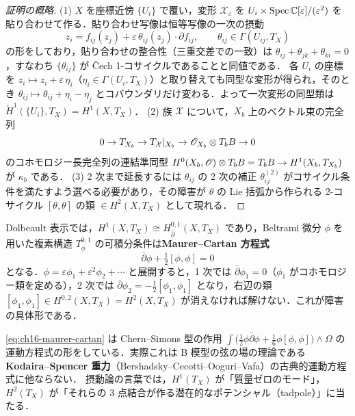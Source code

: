 \begin{proof}[証明の概略]
(1) $X$ を座標近傍 $\{U_i\}$ で覆い，変形 $\mathcal{X}_\varepsilon$ を $U_i\times\operatorname{Spec}\mathbb{C}[\varepsilon]/(\varepsilon^2)$ を貼り合わせて作る．貼り合わせ写像は恒等写像の一次の摂動
\[
z_i=f_{ij}(z_j)+\varepsilon\,\theta_{ij}(z_j)\cdot\partial f_{ij},\qquad \theta_{ij}\in\Gamma(U_{ij},T_X)
\]
の形をしており，貼り合わせの整合性（三重交差での一致）は $\theta_{ij}+\theta_{jk}+\theta_{ki}=0$，すなわち $\{\theta_{ij}\}$ が \v{C}ech 1-コサイクルであることと同値である．
各 $U_i$ の座標を $z_i\mapsto z_i+\varepsilon\,\eta_i$（$\eta_i\in\Gamma(U_i,T_X)$）と取り替えても同型な変形が得られ，そのとき $\theta_{ij}\mapsto\theta_{ij}+\eta_i-\eta_j$ とコバウンダリだけ変わる．よって一次変形の同型類は $\check H^1(\{U_i\},T_X)=H^1(X,T_X)$．
(2) 族 $\mathcal{X}$ について，$X_b$ 上のベクトル束の完全列
\[
0\to T_{X_b}\to T_{\mathcal{X}}|_{X_b}\to \mathscr{O}_{X_b}\otimes T_bB\to0
\]
のコホモロジー長完全列の連結準同型 $H^0(X_b,\mathscr{O})\otimes T_bB=T_bB\to H^1(X_b,T_{X_b})$ が $\kappa_b$ である．
(3) 2 次まで延長するには $\theta_{ij}$ の 2 次の補正 $\theta^{(2)}_{ij}$ がコサイクル条件を満たすよう選べる必要があり，その障害が $\theta$ の Lie 括弧から作られる 2-コサイクル $[\theta,\theta]$ の類 $\in H^2(X,T_X)$ として現れる．
\end{proof}

Dolbeault 表示では，$H^1(X,T_X)\cong H^{0,1}_{\bar\partial}(X,T_X)$ であり，Beltrami 微分 $\phi$ を用いた複素構造 $T^{0,1}_\phi$ の可積分条件は\textbf{Maurer--Cartan 方程式}
\begin{equation}
\bar\partial\phi+\tfrac12[\phi,\phi]=0
\label{eq:ch16-maurer-cartan}
\end{equation}
となる．$\phi=\varepsilon\phi_1+\varepsilon^2\phi_2+\cdots$ と展開すると，1 次では $\bar\partial\phi_1=0$（$\phi_1$ がコホモロジー類を定める），2 次では $\bar\partial\phi_2=-\tfrac12[\phi_1,\phi_1]$ となり，右辺の類 $[\phi_1,\phi_1]\in H^{0,2}(X,T_X)=H^2(X,T_X)$ が消えなければ解けない．これが障害の具体形である．

\begin{physbox}
\eqref{eq:ch16-maurer-cartan} は Chern--Simons 型の作用 $\int \bigl(\tfrac12\phi\bar\partial\phi+\tfrac16\phi[\phi,\phi]\bigr)\wedge\Omega$ の運動方程式の形をしている．実際これは B 模型の弦の場の理論である \textbf{Kodaira--Spencer 重力}（Bershadsky--Cecotti--Ooguri--Vafa）の古典的運動方程式に他ならない．
摂動論の言葉では，$H^1(T_X)$ が「質量ゼロのモード」，$H^2(T_X)$ が「それらの 3 点結合が作る潜在的なポテンシャル（tadpole）」に当たる．
\end{physbox}

